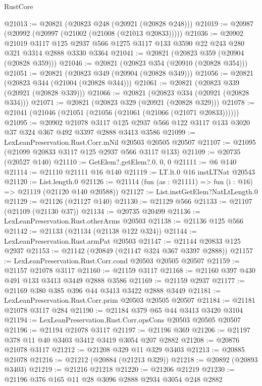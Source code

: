\begin{lexlean}{RustCore}
\begin{coremodule}
@21013 := @20821 (@20823 @248 (@20921 (@20828 @248)))
@21019 := @20987 (@20992 (@20997 (@21002 (@21008 (@21013 @20833)))))
@21036 := @20902
    @21019
    @3117
    @125
    @2937
    @566
    @1275
    @3117
    @133
    @3590
    @22
    @243
    @280
    @321
    @3314
    @2888
    @3330
    @3364
@21041 := @20821 (@20823 @359 (@20904 (@20828 @359)))
@21046 := @20821 (@20823 @354 (@20910 (@20828 @354)))
@21051 := @20821 (@20823 @349 (@20904 (@20828 @349)))
@21056 := @20821 (@20823 @344 (@21004 (@20828 @344)))
@21061 := @20821 (@20823 @339 (@20921 (@20828 @339)))
@21066 := @20821 (@20823 @334 (@20921 (@20828 @334)))
@21071 := @20821 (@20823 @329 (@20921 (@20828 @329)))
@21078 := @21041 (@21046 (@21051 (@21056 (@21061 (@21066 (@21071 @20833))))))
@21095 := @20902
    @21078
    @3117
    @125
    @2937
    @566
    @122
    @3117
    @133
    @3020
    @37
    @324
    @367
    @492
    @3397
    @2888
    @3413
    @3586
@21099 := LexLeanPreservation.Rust.Corr.mNil @20503 @20505 @20507
@21107 := @21095 (@21099 @20833 @3117 @125 @2937 @566 @3117 @133)
@21109 := @20735 (@20527 @140)
@21110 := GetElem?.getElem?.{0, 0, 0}
@21111 := @6 @140
@21114 := @21110 @21111 @16 @140
@21119 := LT.lt.{0} @16 instLTNat @20543
@21120 := List.length.{0}
@21126 := @21114 (fun (as : @21111) => fun (i : @16) => @21119 (@21120 @140 @20588))
@21127 := List.instGetElem?NatLtLength.{0}
@21129 := @21126 (@21127 @140)
@21130 := @21129 @566
@21133 := @21107 (@21109 (@21130 @37))
@21134 := @20735 @20499
@21136 := LexLeanPreservation.Rust.otherArms @20503
@21138 := @21136 @125 @566
@21142 := @21133 (@21134 (@21138 @122 @324))
@21144 := LexLeanPreservation.Rust.armPat @20503
@21147 := @21144 @20833 @125 @2937
@21153 := @21142 (@20849 (@21147 @324 @367 @3397 @2888))
@21157 := LexLeanPreservation.Rust.Corr.cond @20503 @20505 @20507
@21159 := @21157 @21078 @3117
@21160 := @21159 @3117
@21168 := @21160 @397 @430 @491 @133 @3413 @3449 @2888 @3586
@21169 := @21159 @2937
@21177 := @21169 @380 @385 @396 @44 @3413 @3422 @2888 @3449
@21181 := LexLeanPreservation.Rust.Corr.prim @20503 @20505 @20507
@21184 := @21181 @21078 @3117 @284
@21190 := @21184 @379 @65 @44 @3413 @3420 @3104
@21194 := LexLeanPreservation.Rust.Corr.opsCons @20503 @20505 @20507
@21196 := @21194 @21078 @3117
@21197 := @21196 @369
@21206 := @21197 @378 @11 @40 @3403 @3412 @3419 @3054 @207 @2882
@21208 := @20876 @21078 @3117
@21212 := @21208 @329 @11 @329 @3403
@21213 := @20885 @21078
@21216 := @21212 (@20884 (@21213 @329))
@21218 := @20892 (@20893 @3403)
@21219 := @21216 @21218
@21220 := @21206 @21219
@21230 := @21196 @376 @165 @11 @28 @3096 @2888 @2934 @3054 @248 @2882

\end{coremodule}
\end{lexlean}
